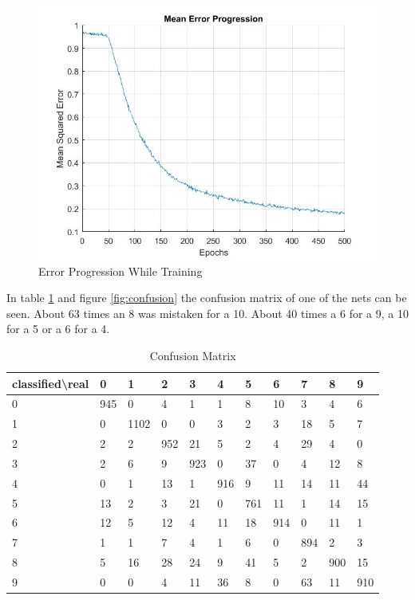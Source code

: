 \documentclass[paper=a4, fontsize=11pt]{scrartcl} %
\numberwithin{equation}{section} %
\numberwithin{figure}{section} %
\numberwithin{table}{section} %
\begin{document}
\begin{figure}[H]
	\centering
	\includegraphics[width = 0.6\linewidth]{./errorProgression.jpg}
	\caption{Error Progression While Training}
	\label{fig:error}
\end{figure}

In table \ref{tab:confusion} and figure \ref{fig:confusion} the confusion matrix of one of the nets can be seen. About 63 times an 8 was mistaken for a 10. About 40 times a 6 for a 9, a 10 for a 5 or a 6 for a 4.

\begin{table}[H]
\centering
\caption{Confusion Matrix}
\label{tab:confusion}
\begin{tabular}{|l||llllllllll|}
\hline
classified\textbackslash real & 0 & 1 & 2 & 3 & 4 & 5 & 6 & 7 & 8 & 9 \\ \hline\hline
0 & 945 & 0 & 4 & 1 & 1 & 8 & 10 & 3 & 4 & 6 \\ \hline
1 & 0 & 1102 & 0 & 0 & 3 & 2 & 3 & 18 & 5 & 7 \\ \hline
2 & 2 & 2 & 952 & 21 & 5 & 2 & 4 & 29 & 4 & 0 \\ \hline
3 & 2 & 6 & 9 & 923 & 0 & 37 & 0 & 4 & 12 & 8 \\ \hline
4 & 0 & 1 & 13 & 1 & 916 & 9 & 11 & 14 & 11 & 44 \\ \hline
5 & 13 & 2 & 3 & 21 & 0 & 761 & 11 & 1 & 14 & 15 \\ \hline
6 & 12 & 5 & 12 & 4 & 11 & 18 & 914 & 0 & 11 & 1 \\ \hline
7 & 1 & 1 & 7 & 4 & 1 & 6 & 0 & 894 & 2 & 3 \\ \hline
8 & 5 & 16 & 28 & 24 & 9 & 41 & 5 & 2 & 900 & 15 \\ \hline
9 & 0 & 0 & 4 & 11 & 36 & 8 & 0 & 63 & 11 & 910 \\ \hline
\end{tabular}
\end{table}
\end{document}
